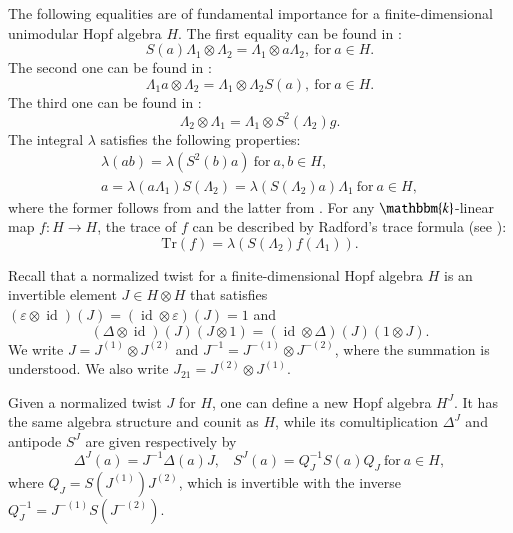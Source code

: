 \documentclass[11pt]{amsart}
\numberwithin{equation}{section}
\begin{document}
The following equalities are of fundamental importance for a  finite-dimensional unimodular Hopf algebra $H$. 
The first equality can be found in \cite[Lemma 1.2]{LR}:
\begin{equation}\label{equ004}S(a)\Lambda_{1}\otimes \Lambda_{2}=\Lambda_{1}\otimes a\Lambda_{2},\ \text{for}\ a\in H.\end{equation}
The second one can be found in \cite{KMN}:
\begin{equation}\label{equ005}\Lambda_{1}a\otimes \Lambda_{2}=\Lambda_{1}\otimes \Lambda_{2}S(a),\ \text{for}\ a\in H.\end{equation}
The third one can be found in \cite[Theorem 3(d)]{Rad}: 
\begin{equation}\label{0e}\Lambda_{2}\otimes \Lambda_{1}=\Lambda_{1}\otimes S^2(\Lambda_{2})g.\end{equation}
The integral $\lambda$ satisfies the following properties:
\begin{gather}
\label{equ4004}\lambda(ab)=\lambda(S^2(b)a)\ \text{for}\ a,b\in H,\\
\label{equ4004444}a=\lambda(a\Lambda_{1})S(\Lambda_{2})=\lambda(S(\Lambda_2)a)\Lambda_{1}\ \text{for}\ a\in H,
\end{gather}
where the former follows from \cite[Theorem 3(a)]{Rad} and the latter from \cite[Eq. (1)]{Rad}.
For any  $\mathbbm{k}$-linear map $f:H\rightarrow H$, the trace of $f$ can be described by Radford's trace formula (see \cite[Theorem 2]{Rad}): \begin{equation}\label{equ400444}\text{Tr}(f)=\lambda(S(\Lambda_{2})f(\Lambda_{1})).\end{equation}

Recall that a normalized twist for a finite-dimensional Hopf algebra $H$ is an invertible element $J\in H\otimes H$ that satisfies $(\varepsilon\otimes \operatorname{id})(J)=(\operatorname{id}\otimes\varepsilon)(J)=1$ and
\begin{equation}\label{qq1}(\Delta\otimes \operatorname{id})(J)(J\otimes1)=(\operatorname{id}\otimes\Delta)(J)(1\otimes J).\end{equation}
We write $J=J^{(1)}\otimes J^{(2)}$ and $J^{-1}=J^{-(1)}\otimes J^{-(2)}$, where the summation is understood. We also write $J_{21}=J^{(2)}\otimes J^{(1)}$.

Given a normalized twist $J$ for $H$, one can define a new Hopf algebra $H^{J}$. It has the same algebra structure and counit as $H$, while its comultiplication $\Delta^J$ and antipode $S^J$ are given respectively by
$$\Delta^J(a)=J^{-1}\Delta(a)J,\ \ \ \
S^J(a)=Q^{-1}_JS(a)Q_J\ \text{for}\ a\in H,$$
where $Q_J=S(J^{(1)})J^{(2)}$, which is invertible with the inverse  $Q_J^{-1}=J^{-(1)}S(J^{-(2)})$.
\end{document}

